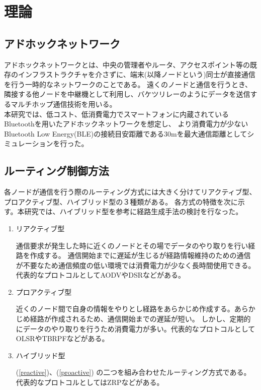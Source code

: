 \documentclass[a4paper, 9pt]{ltjsarticle}
\begin{document}
\section{理論}
\subsection{アドホックネットワーク}
アドホックネットワークとは、中央の管理者やルータ、アクセスポイント等の既存のインフラストラクチャを介さずに、端末(以降ノードという)同士が直接通信を行う一時的なネットワークのことである。
遠くのノードと通信を行うとき、隣接する他ノードを中継機として利用し、バケツリレーのようにデータを送信するマルチホップ通信技術を用いる。%
\\ \indent 本研究では、低コスト、低消費電力でスマートフォンに内蔵されているBluetoothを用いたアドホックネットワークを想定し、
より消費電力が少ないBluetooth Low Energy(BLE)の接続目安距離である30mを最大通信距離としてシミュレーションを行った。

\subsection{ルーティング制御方法}
各ノードが通信を行う際のルーティング方式には大きく分けてリアクティブ型、プロアクティブ型、ハイブリッド型の３種類がある。
各方式の特徴を次に示す。本研究では、ハイブリッド型を参考に経路生成手法の検討を行なった。
\begin{enumerate}
  \item \label{reactive} リアクティブ型 \par  
  \indent 通信要求が発生した時に近くのノードとその場でデータのやり取りを行い経路を作成する。
  通信開始までに遅延が生じるが経路情報維持のための通信が不要なため通信頻度の低い環境では消費電力が少なく長時間使用できる。
  代表的なプロトコルとしてAODVやDSRなどがある。

  \item \label{proactive} プロアクティブ型 \par
  \indent 近くのノード間で自身の情報をやりとし経路をあらかじめ作成する。あらかじめ経路が作成されるため、通信開始までの遅延が短い。  
  しかし、定期的にデータのやり取りを行うため消費電力が多い。代表的なプロトコルとしてOLSRやTBRPFなどがある。

  \item ハイブリッド型 \par
  \indent (\ref{reactive})、(\ref{proactive}) の二つを組み合わせたルーティング方式である。代表的なプロトコルとしてはZRPなどがある。
\end{enumerate}
\end{document}

